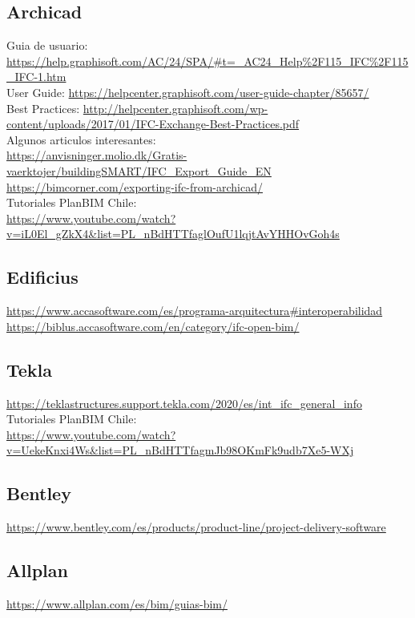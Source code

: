 \documentclass[spanish,12pt,a4paper,final,oneside]{book}
\begin{document}
\subsection{Archicad}
Guia de usuario: \url{https://help.graphisoft.com/AC/24/SPA/#t=_AC24_Help%2F115_IFC%2F115_IFC-1.htm}
\\User Guide: \url{https://helpcenter.graphisoft.com/user-guide-chapter/85657/}
\\Best Practices: \url{http://helpcenter.graphisoft.com/wp-content/uploads/2017/01/IFC-Exchange-Best-Practices.pdf}
\\Algunos articulos interesantes:
\\ \url{https://anvisninger.molio.dk/Gratis-vaerktojer/buildingSMART/IFC_Export_Guide_EN}
\\ \url{https://bimcorner.com/exporting-ifc-from-archicad/}
\\Tutoriales PlanBIM Chile: \\ \url{https://www.youtube.com/watch?v=iL0El_gZkX4&list=PL_nBdHTTfaglOufU1lqjtAvYHHOvGoh4s}




\subsection{Edificius}
\url{https://www.accasoftware.com/es/programa-arquitectura#interoperabilidad}
\\ \url{https://biblus.accasoftware.com/en/category/ifc-open-bim/}



\subsection{Tekla}
\url{https://teklastructures.support.tekla.com/2020/es/int_ifc_general_info}
\\Tutoriales PlanBIM Chile: \\ \url{https://www.youtube.com/watch?v=UekeKnxi4Ws&list=PL_nBdHTTfagmJb98OKmFk9udb7Xe5-WXj}

\subsection{Bentley}
\url{https://www.bentley.com/es/products/product-line/project-delivery-software}


\subsection{Allplan}
\url{https://www.allplan.com/es/bim/guias-bim/}
\end{document}
